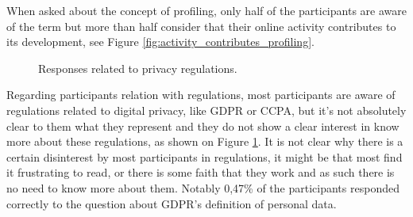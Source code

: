 
When asked about the concept of profiling, only half of the participants
are aware of the term but more than half consider that their online
activity contributes to its development, see Figure \ref{fig:activity_contributes_profiling}.

\begin{figure}
    \begin{center}
        \caption{Responses related to privacy regulations.}
        \label{fig:privacy_regulations}
    \end{center}
\end{figure}

Regarding participants relation with regulations, most participants are
aware of regulations related to digital privacy, like GDPR or CCPA, but
it's not absolutely clear to them what they represent and they do not
show a clear interest in know more about these regulations, as shown on Figure \ref{fig:privacy_regulations}. It is not
clear why there is a certain disinterest by most participants in regulations,
it might be that most find it frustrating to read, or there is some
faith that they work and as such there is no need to know more about them.
Notably 0,47\% of the participants responded correctly to the question
about GDPR's definition of personal data.

